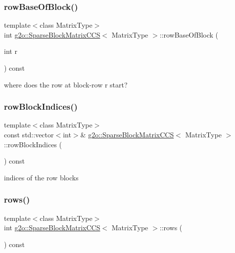 \subsubsection{\texorpdfstring{row\+Base\+Of\+Block()}{rowBaseOfBlock()}}
{\footnotesize\ttfamily template$<$class Matrix\+Type$>$ \\
int \mbox{\hyperlink{classg2o_1_1_sparse_block_matrix_c_c_s}{g2o\+::\+Sparse\+Block\+Matrix\+C\+CS}}$<$ Matrix\+Type $>$\+::row\+Base\+Of\+Block (\begin{DoxyParamCaption}\item[{int}]{r }\end{DoxyParamCaption}) const\hspace{0.3cm}{\ttfamily [inline]}}



where does the row at block-\/row r start? 

\mbox{\label{classg2o_1_1_sparse_block_matrix_c_c_s_aafbd3a59409bcf2d518cda71d8a33229}} 
\subsubsection{\texorpdfstring{row\+Block\+Indices()}{rowBlockIndices()}}
{\footnotesize\ttfamily template$<$class Matrix\+Type$>$ \\
const std\+::vector$<$int$>$\& \mbox{\hyperlink{classg2o_1_1_sparse_block_matrix_c_c_s}{g2o\+::\+Sparse\+Block\+Matrix\+C\+CS}}$<$ Matrix\+Type $>$\+::row\+Block\+Indices (\begin{DoxyParamCaption}{ }\end{DoxyParamCaption}) const\hspace{0.3cm}{\ttfamily [inline]}}



indices of the row blocks 

\mbox{\label{classg2o_1_1_sparse_block_matrix_c_c_s_ad98ce4c84411c9982b06a025ad94ce57}} 
\subsubsection{\texorpdfstring{rows()}{rows()}}
{\footnotesize\ttfamily template$<$class Matrix\+Type$>$ \\
int \mbox{\hyperlink{classg2o_1_1_sparse_block_matrix_c_c_s}{g2o\+::\+Sparse\+Block\+Matrix\+C\+CS}}$<$ Matrix\+Type $>$\+::rows (\begin{DoxyParamCaption}{ }\end{DoxyParamCaption}) const\hspace{0.3cm}{\ttfamily [inline]}}



